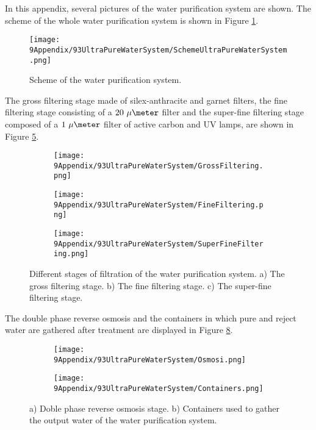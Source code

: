 In this appendix, several pictures of the water purification system are shown. The scheme of the whole water purification system is shown in Figure \ref{fig:SchemeUPWS}.
\begin{figure}[htbp]
\centering
\texttt{[image: 9Appendix/93UltraPureWaterSystem/SchemeUltraPureWaterSystem.png]}
\caption{Scheme of the water purification system.\label{fig:SchemeUPWS}}
\end{figure}
The gross filtering stage made of silex-anthracite and garnet filters, the fine filtering stage consisting of a $20~\mu\meter$ filter and the super-fine filtering stage composed of a $1~\mu\meter$ filter of active carbon and UV lamps, are shown in Figure \ref{fig:UltraPureWaterStages}.
\begin{figure}\centering
    \begin{subfigure}[b]{0.3\textwidth}
    \centering
    \texttt{[image: 9Appendix/93UltraPureWaterSystem/GrossFiltering.png]}  
    \caption{\label{subfig:GrossFiltering}}
    \end{subfigure}
    \hfill
    \begin{subfigure}[b]{0.3\textwidth}
    \centering
    \texttt{[image: 9Appendix/93UltraPureWaterSystem/FineFiltering.png]}  
    \caption{\label{subfig:FineFiltering}}
    \end{subfigure}
    \hfill
    \begin{subfigure}[b]{0.3\textwidth}
    \centering
    \texttt{[image: 9Appendix/93UltraPureWaterSystem/SuperFineFiltering.png]}  
    \caption{\label{subfig:SuperFineFiltering}}
    \end{subfigure}
 \caption{Different stages of filtration of the water purification system. a) The gross filtering stage. b) The fine filtering stage. c) The super-fine filtering stage.}
 \label{fig:UltraPureWaterStages}
\end{figure}
The double phase reverse osmosis and the containers in which pure and reject water are gathered after treatment are displayed in Figure \ref{fig:OsmosisContainers}.
\begin{figure}
\centering
    \begin{subfigure}[b]{0.5\textwidth}
    \centering
    \texttt{[image: 9Appendix/93UltraPureWaterSystem/Osmosi.png]}  
    \caption{\label{subfig:Osmosi}}
    \end{subfigure}
    \hfill
    \begin{subfigure}[b]{0.8\textwidth}
    \centering
    \texttt{[image: 9Appendix/93UltraPureWaterSystem/Containers.png]}  
    \caption{\label{subfig:Containers}}
    \end{subfigure}
 \caption{a) Doble phase reverse osmosis stage. b) Containers used to gather the output water of the water purification system.}
 \label{fig:OsmosisContainers}
\end{figure}
